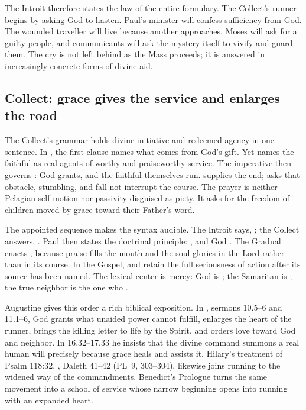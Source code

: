 The Introit therefore states the law of the entire formulary. The Collect's
runner begins by asking God to hasten. Paul's minister will confess sufficiency
from God. The wounded traveller will live because another approaches. Moses
will ask for a guilty people, and communicants will ask the mystery itself to
vivify and guard them. The cry is not left behind as the Mass proceeds; it is
answered in increasingly concrete forms of divine aid.

\elementguard
\subsection*{Collect: grace gives the service and enlarges the road }

The Collect's grammar holds divine initiative and redeemed agency in one
sentence. In , the first  clause names what comes from
God's gift. Yet  names the faithful as real agents of
worthy and praiseworthy service. The imperative  then governs
: God grants, and the faithful
themselves run.  supplies the end;  asks that obstacle, stumbling, and fall not interrupt the course.
The prayer is neither Pelagian self-motion nor passivity disguised as piety.
It asks for the freedom of children moved by grace toward their Father's word.

The appointed sequence makes the syntax audible. The Introit says,
; the Collect answers,
. Paul then states the doctrinal
principle: , and God
. The Gradual enacts
, because praise fills the mouth and the soul glories in
the Lord rather than in its course. In the Gospel, 
and  retain the full seriousness of action
after its source has been named. The lexical center is mercy: God is
; the Samaritan is ; the true
neighbor is the one who .

Augustine gives this order a rich biblical exposition. In
, sermons 10.5--6 and 11.1--6, God grants what
unaided power cannot fulfill, enlarges the heart of the runner, brings the
killing letter to life by the Spirit, and orders love toward God and neighbor.
In  16.32--17.33 he insists that the divine
command summons a real human will precisely because grace heals and assists
it. Hilary's treatment of Psalm 118:32, ,
Daleth 41--42 (PL~9, 303--304), likewise joins running to the widened way of
the commandments. Benedict's Prologue turns the same movement into a school
of service whose narrow beginning opens into running with an expanded heart.

